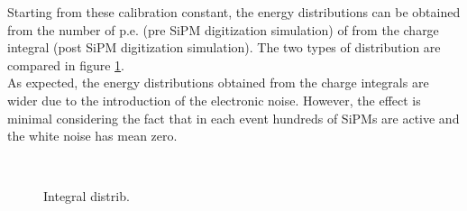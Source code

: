 Starting from these calibration constant, the energy distributions can be obtained from the number of p.e. (pre SiPM digitization simulation) of from the charge integral (post SiPM digitization simulation). The two types of distribution are compared in figure \ref{fig:cfr_e_dist}.\\
As expected, the energy distributions obtained from the charge integrals are wider due to the introduction of the electronic noise. However, the effect is minimal considering the fact that in each event hundreds of SiPMs are active and the white noise has mean zero.\\

\begin{figure}
	\centering
	 \\
	\caption{Integral distrib.}
	\label{fig:cfr_e_dist}
\end{figure}

